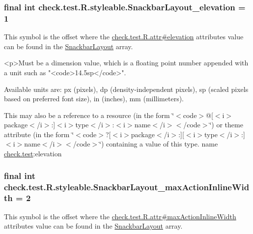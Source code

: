 \subsubsection[{Snackbar\+Layout\+\_\+elevation}]{\setlength{\rightskip}{0pt plus 5cm}final int check.\+test.\+R.\+styleable.\+Snackbar\+Layout\+\_\+elevation = 1\hspace{0.3cm}{\ttfamily [static]}}\label{classcheck_1_1test_1_1_r_1_1styleable_a803835166d359a018ca194cce78d142c}
This symbol is the offset where the \hyperlink{classcheck_1_1test_1_1_r_1_1attr_acf20b055f3e563dc5c426990bf2b3b7e}{check.\+test.\+R.\+attr\#elevation} attribute\textquotesingle{}s value can be found in the \hyperlink{classcheck_1_1test_1_1_r_1_1styleable_ad7fc8f60242ddfaa068c43f614e1ff65}{Snackbar\+Layout} array.

\begin{DoxyVerb}      <p>Must be a dimension value, which is a floating point number appended with a unit such as "<code>14.5sp</code>".
\end{DoxyVerb}
 Available units are\+: px (pixels), dp (density-\/independent pixels), sp (scaled pixels based on preferred font size), in (inches), mm (millimeters). 

This may also be a reference to a resource (in the form \char`\"{}$<$code$>$@\mbox{[}$<$i$>$package$<$/i$>$\+:\mbox{]}$<$i$>$type$<$/i$>$\+:$<$i$>$name$<$/i$>$$<$/code$>$\char`\"{}) or theme attribute (in the form \char`\"{}$<$code$>$?\mbox{[}$<$i$>$package$<$/i$>$\+:\mbox{]}\mbox{[}$<$i$>$type$<$/i$>$\+:\mbox{]}$<$i$>$name$<$/i$>$$<$/code$>$\char`\"{}) containing a value of this type.  name \hyperlink{namespacecheck_1_1test}{check.\+test}\+:elevation \hypertarget{classcheck_1_1test_1_1_r_1_1styleable_aa211406667d57a64a280c2c24e4a106d}{}
\subsubsection[{Snackbar\+Layout\+\_\+max\+Action\+Inline\+Width}]{\setlength{\rightskip}{0pt plus 5cm}final int check.\+test.\+R.\+styleable.\+Snackbar\+Layout\+\_\+max\+Action\+Inline\+Width = 2\hspace{0.3cm}{\ttfamily [static]}}\label{classcheck_1_1test_1_1_r_1_1styleable_aa211406667d57a64a280c2c24e4a106d}
This symbol is the offset where the \hyperlink{classcheck_1_1test_1_1_r_1_1attr_aaf48db98a44dd24bf15a4986a845fa97}{check.\+test.\+R.\+attr\#max\+Action\+Inline\+Width} attribute\textquotesingle{}s value can be found in the \hyperlink{classcheck_1_1test_1_1_r_1_1styleable_ad7fc8f60242ddfaa068c43f614e1ff65}{Snackbar\+Layout} array.

